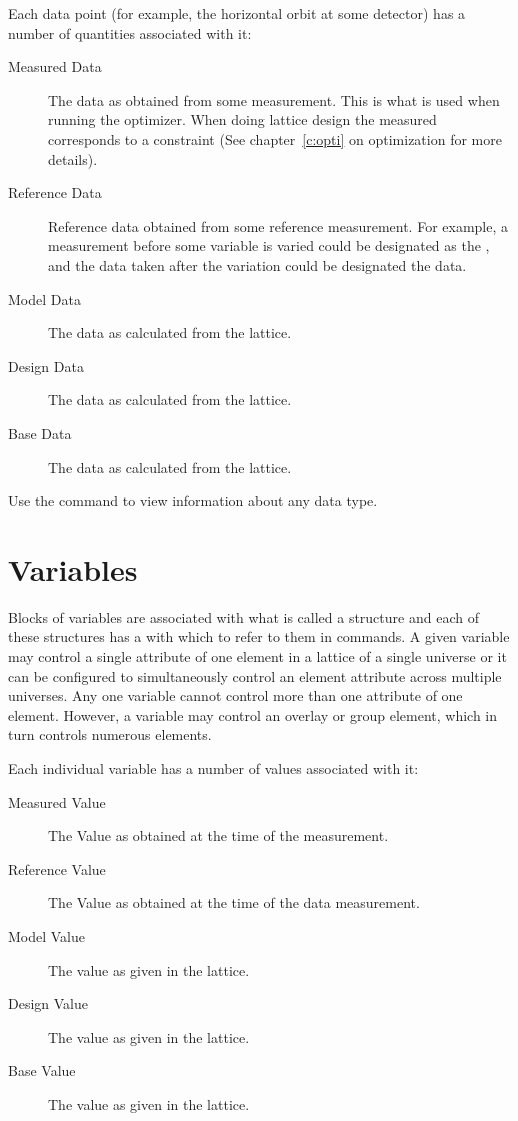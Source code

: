 Each data point (for example, the horizontal orbit at some
detector) has a number of quantities associated with it:
  \vspace*{-3ex}
  \begin{description}
  \item[Measured Data] \Newline 
The data as obtained from some measurement. This is what is used when running the optimizer.
When doing lattice design the measured  corresponds to
a constraint (See chapter~\ref{c:opti} on optimization for more details).
  \item[Reference Data] \Newline
Reference data obtained from some reference measurement. For example,
a measurement before some variable is varied could be designated as
the , and the data taken after the variation could be 
designated the  data.
  \item[Model Data] \Newline
The data as calculated from the  lattice.
  \item[Design Data] \Newline
The data as calculated from the  lattice.
  \item[Base Data] \Newline
The data as calculated from the  lattice.
  \end{description}

Use the  command to view information about any data type.

\vfill
\break
\section{Variables}

Blocks of variables are associated with what is called a
 structure and each of these structures has a 
with which to refer to them in \tao commands. A given variable may
control a single attribute of one element in a  lattice
of a single universe or it can be configured to simultaneously
control an element attribute across multiple universes. Any one variable 
cannot control more than one attribute of one element. However, a variable
may control an overlay or group element, which in turn controls numerous elements.

Each individual variable has a number of values associated with it:
  \vspace*{-3ex}
  \begin{description}
  \item[Measured Value] \Newline
The Value as obtained at the time of the  measurement.
  \item[Reference Value] \Newline
The Value as obtained at the time of the  data  measurement.
  \item[Model Value] \Newline
The value as given in the  lattice.
  \item[Design Value] \Newline
The value as given in the  lattice.
  \item[Base Value] \Newline
The value as given in the  lattice.
  \end{description}

